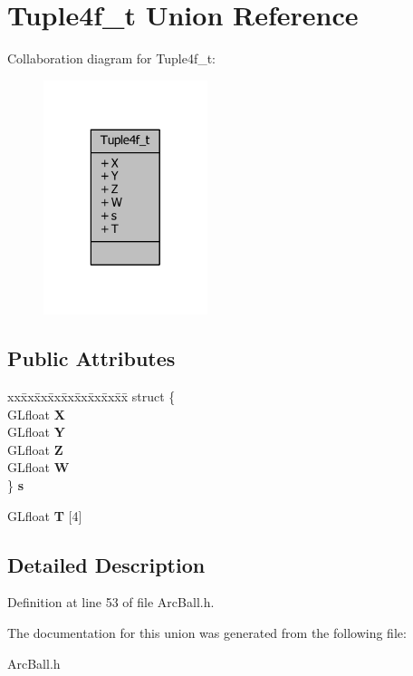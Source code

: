 \section{Tuple4f\-\_\-t Union Reference}
\label{unionTuple4f__t}


Collaboration diagram for Tuple4f\-\_\-t\-:
\nopagebreak
\begin{figure}[H]
\begin{center}
\leavevmode
\includegraphics[width=136pt]{d1/dc9/unionTuple4f__t__coll__graph}
\end{center}
\end{figure}
\subsection*{Public Attributes}
\begin{DoxyCompactItemize}
\item 
\begin{tabbing}
xx\=xx\=xx\=xx\=xx\=xx\=xx\=xx\=xx\=\kill
struct \{\\
\>GLfloat {\bfseries X}\\
\>GLfloat {\bfseries Y}\\
\>GLfloat {\bfseries Z}\\
\>GLfloat {\bfseries W}\\
\} {\bfseries s}\label{unionTuple4f__t_ab52139a7b3648402c5db91404d53e2fe}
\\

\end{tabbing}\item 
G\-Lfloat {\bfseries T} [4]\label{unionTuple4f__t_addcfe59f9756aa917f1cc99c7989ba13}

\end{DoxyCompactItemize}


\subsection{Detailed Description}


Definition at line 53 of file Arc\-Ball.\-h.



The documentation for this union was generated from the following file\-:\begin{DoxyCompactItemize}
\item 
Arc\-Ball.\-h\end{DoxyCompactItemize}
